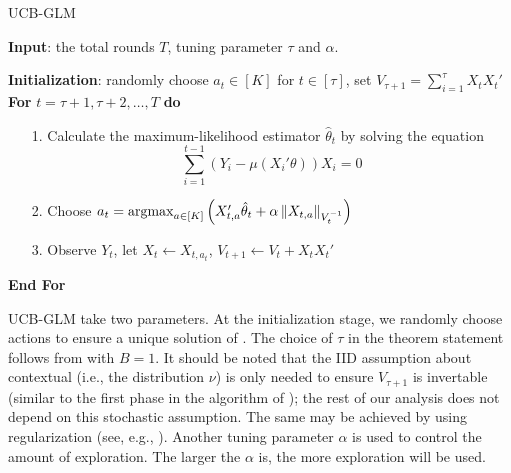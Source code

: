 \begin{algorithm}
\caption{UCB-GLM}\label{alg: UCB}
\vspace{0.05in}
\textbf{Input}: the total rounds $T$, tuning parameter $\tau$ and $\alpha$. \vspace{0.00in}

\textbf{Initialization}: randomly choose $a_t \in [K]$ for $t \in [\tau]$, set $V_{\tau+1}=\sum_{i=1}^{\tau} X_{t}X_{t}'$ \\ \vspace{0.05in}
\textbf{For} {$t=\tau+1,\tau+2,\ldots,T$} \textbf{do} \vspace{-0.15in}
 \begin{itemize}
 \item[1.] Calculate the maximum-likelihood estimator $ \hat{\theta}_t$ by solving the equation \vspace{-3mm}
 \begin{equation} \label{eq:algquasi}
 \sum_{i=1}^{t-1} (Y_i - \mu(X_i'\theta)) X_i =0
 \end{equation}\vspace{-5mm}
 \item[2.] Choose $a_t = \mathop{\rm argmax}_{a \in [K]} \left ( X_{t,a}'\hat{\theta}_t + \alpha \left\|X_{t,a}\right\|_{V_{t}^{-1}} \right)$ \vspace{-5mm}
 \item[3.] Observe $Y_t$, let $X_t \leftarrow X_{t,a_t}$, $V_{t+1} \leftarrow V_t+X_{t}X_{t}'$
 \end{itemize} \vspace{-2mm}
\textbf{End For} \vspace{0.05in}
\end{algorithm}

UCB-GLM take two parameters. At the initialization stage, we randomly choose actions to ensure a unique solution of .  The choice of $\tau$ in the theorem statement follows from  with $B=1$.  It should be noted that the IID assumption about contextual (i.e., the distribution $\nu$) is only needed to ensure $V_{\tau+1}$ is invertable (similar to the first phase in the algorithm of \citet{filippi2010parametric}); the rest of our analysis does not depend on this stochastic assumption.  The same may be achieved by using regularization (see, e.g., \citet{abbasi2011improved}).
%
Another tuning parameter $\alpha$ is used to control the amount of exploration. The larger the $\alpha$ is, the more exploration will be used.

